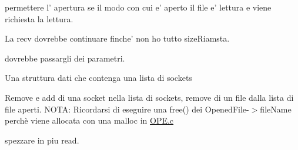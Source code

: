 \begin{DoxyRefList}
permettere l' apertura se il modo con cui e' aperto il file e' lettura e viene richiesta la lettura.  
\item[\label{todo__todo000003}%
\hypertarget{todo__todo000003}{}%
Globale \hyperlink{Client_2READ_8c_a0b8dfa171c3b5c784fb6cba643728110}{read\+From} (\hyperlink{structMyDFSId}{My\+D\+F\+S\+Id} $\ast$id, int size\+Rimasta, int pos)]La recv dovrebbe continuare finche' non ho tutto size\+Riamsta.  
\item[\label{todo__todo000009}%
\hypertarget{todo__todo000009}{}%
Globale \hyperlink{server_8c_a5e7b14672f9e2c9fa99b363004afb8e8}{spawn\+Thread} ()]dovrebbe passargli dei parametri.  
\item[\label{todo__todo000010}%
\hypertarget{todo__todo000010}{}%
File \hyperlink{StruttureDati_8c}{Strutture\+Dati.c} ]Una struttura dati che contenga una lista di sockets 

Remove e add di una socket nella lista di sockets, remove di un file dalla lista di file aperti. N\+O\+T\+A\+: Ricordarsi di eseguire una free() dei Opened\+File-\/$>$file\+Name perchè viene allocata con una malloc in \hyperlink{OPE_8c}{O\+P\+E.\+c} 
\item[\label{todo__todo000001}%
\hypertarget{todo__todo000001}{}%
Globale \hyperlink{Client_2CLOSE_8c_affca868a39ef47e0de0a54b7fca94e10}{upload\+Changes} (\hyperlink{structMyDFSId}{My\+D\+F\+S\+Id} $\ast$id)]spezzare in piu read. 
\end{DoxyRefList}